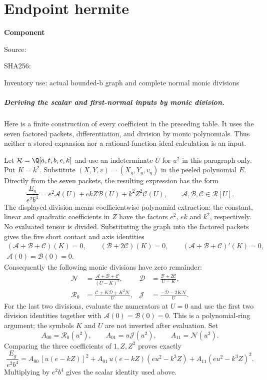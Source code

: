 \chapter{Endpoint hermite}
\label{component:p935c9d6318ea}
\noindent\textbf{Component }\par
{\small\noindent Source: \par}
{\small\noindent SHA256: \par}
{\small\noindent Inventory use: actual bounded-b graph and complete normal monic divisions\par}
\medskip
\paragraph{Deriving the scalar and first-normal inputs by monic division.}
Here is a finite construction of every coefficient in the preceding table. It uses the seven factored packets, differentiation, and division by monic polynomials. Thus neither a stored expansion nor a rational-function ideal calculation is an input.

Let $\mathcal R=\Q[a,t,b,e,k]$ and use an indeterminate $U$ for $u^2$ in this paragraph only. Put $K=k^2$. Substitute $(X,Y,v)=(X_g,Y_g,v_g)$ in the peeled polynomial $E$. Directly from the seven packets, the resulting expression has the form
\[
\frac{E_g}{e^2b^4}=e^2\mathcal A(U)+ekZ\mathcal B(U)+k^2Z^2\mathcal C(U),
\qquad \mathcal A,\mathcal B,\mathcal C\in\mathcal R[U].
\]
The displayed division means coefficientwise polynomial extraction: the constant, linear and quadratic coefficients in $Z$ have the factors $e^2$, $ek$ and $k^2$, respectively. No evaluated tensor is divided. Substituting the graph into the factored packets gives the five short contact and axis identities
\begin{gather*}
(\mathcal A+\mathcal B+\mathcal C)(K)=0,\qquad
(\mathcal B+2\mathcal C)(K)=0,\qquad
(\mathcal A+\mathcal B+\mathcal C)'(K)=0,\\
\mathcal A(0)=\mathcal B(0)=0.
\end{gather*}
Consequently the following monic divisions have zero remainder:
\begin{align*}
\mathcal N&=\frac{\mathcal A+\mathcal B+\mathcal C}{(U-K)^2},&
\mathcal D&=\frac{\mathcal B+2\mathcal C}{U-K},\\
\mathcal R_0&=\frac{\mathcal C+K\mathcal D+K^2\mathcal N}{U},&
\mathcal J&=\frac{-\mathcal D-2K\mathcal N}{U}.
\end{align*}
For the last two divisions, evaluate the numerators at $U=0$ and use the first two division identities together with $\mathcal A(0)=\mathcal B(0)=0$. This is a polynomial-ring argument; the symbols $K$ and $U$ are not inverted after evaluation. Set
\[
A_{00}=\mathcal R_0(u^2),\qquad A_{01}=u\mathcal J(u^2),
\qquad A_{11}=\mathcal N(u^2).
\]
Comparing the three coefficients of $1,Z,Z^2$ proves exactly
\[
\frac{E_g}{e^2b^4}
=A_{00}\,[u(e-kZ)]^2+A_{01}\,u(e-kZ)(eu^2-k^3Z)
 +A_{11}(eu^2-k^3Z)^2.
\]
Multiplying by $e^2b^4$ gives the scalar identity used above.

